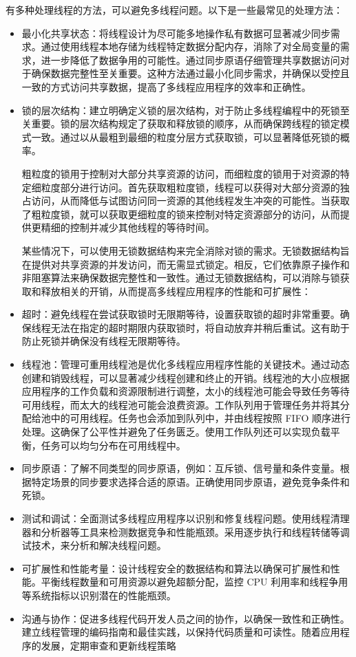 
有多种处理线程的方法，可以避免多线程问题。以下是一些最常见的处理方法：

\begin{itemize}
\item
最小化共享状态：将线程设计为尽可能多地操作私有数据可显著减少同步需求。通过使用线程本地存储为线程特定数据分配内存，消除了对全局变量的需求，进一步降低了数据争用的可能性。通过同步原语仔细管理共享数据访问对于确保数据完整性至关重要。这种方法通过最小化同步需求，并确保以受控且一致的方式访问共享数据，提高了多线程应用程序的效率和正确性。

\item
锁的层次结构：建立明确定义锁的层次结构，对于防止多线程编程中的死锁至关重要。锁的层次结构规定了获取和释放锁的顺序，从而确保跨线程的锁定模式一致。通过以从最粗到最细的粒度分层方式获取锁，可以显著降低死锁的概率。

粗粒度的锁用于控制对大部分共享资源的访问，而细粒度的锁用于对资源的特定细粒度部分进行访问。首先获取粗粒度锁，线程可以获得对大部分资源的独占访问，从而降低与试图访问同一资源的其他线程发生冲突的可能性。当获取了粗粒度锁，就可以获取更细粒度的锁来控制对特定资源部分的访问，从而提供更精细的控制并减少其他线程的等待时间。

某些情况下，可以使用无锁数据结构来完全消除对锁的需求。无锁数据结构旨在提供对共享资源的并发访问，而无需显式锁定。相反，它们依靠原子操作和非阻塞算法来确保数据完整性和一致性。通过无锁数据结构，可以消除与锁获取和释放相关的开销，从而提高多线程应用程序的性能和可扩展性：

\item
超时：避免线程在尝试获取锁时无限期等待，设置获取锁的超时非常重要。确保线程无法在指定的超时期限内获取锁时，将自动放弃并稍后重试。这有助于防止死锁并确保没有线程无限期等待。

\item
线程池：管理可重用线程池是优化多线程应用程序性能的关键技术。通过动态创建和销毁线程，可以显著减少线程创建和终止的开销。线程池的大小应根据应用程序的工作负载和资源限制进行调整，太小的线程池可能会导致任务等待可用线程，而太大的线程池可能会浪费资源。工作队列用于管理任务并将其分配给池中的可用线程。任务也会添加到队列中，并由线程按照 FIFO 顺序进行处理。这确保了公平性并避免了任务匮乏。使用工作队列还可以实现负载平衡，任务可以均匀分布在可用线程中。

\item
同步原语：了解不同类型的同步原语，例如：互斥锁、信号量和条件变量。根据特定场景的同步要求选择合适的原语。正确使用同步原语，避免竞争条件和死锁。

\item
测试和调试：全面测试多线程应用程序以识别和修复线程问题。使用线程清理器和分析器等工具来检测数据竞争和性能瓶颈。采用逐步执行和线程转储等调试技术，来分析和解决线程问题。

\item
可扩展性和性能考量：设计线程安全的数据结构和算法以确保可扩展性和性能。平衡线程数量和可用资源以避免超额分配，监控 CPU 利用率和线程争用等系统指标以识别潜在的性能瓶颈。

\item
沟通与协作：促进多线程代码开发人员之间的协作，以确保一致性和正确性。建立线程管理的编码指南和最佳实践，以保持代码质量和可读性。随着应用程序的发展，定期审查和更新线程策略
\end{itemize}

